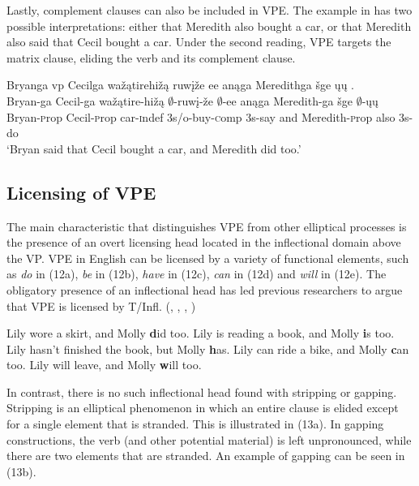 \documentclass[output=paper]{LSP/langsci}
\begin{document}
Lastly, complement clauses can also be included in VPE. The example in  has two possible interpretations: either that Meredith also bought a car, or that Meredith also said that Cecil bought a car. Under the second reading, VPE targets the matrix clause, eliding the verb and its complement clause.

\begin{exe}
\ex
\glll Bryanga {\ob}{vp} Cecilga wažątirehižą ruwįže ee{\cb} anąga Meredithga šge {\ob}ųų{\cb} .\\
Bryan-ga {} Cecil-ga wažątire-hižą $\emptyset$-ruwį-že $\emptyset$-ee anąga Meredith-ga šge $\emptyset$-ųų\\
Bryan-{\textsc prop} {} Cecil-{\textsc prop} car-{\textsc indef} {\textsc 3s/o}-buy-{\textsc comp} {\textsc 3s}-say and Meredith-{\textsc prop} also {\textsc 3s}-do\\
\trans `Bryan said that Cecil bought a car, and Meredith did too.'
\end{exe}


\subsection{Licensing of VPE}

The main characteristic that distinguishes VPE from other elliptical processes is the presence of an overt licensing head located in the inflectional domain above the VP. VPE in English can be licensed by a variety of functional elements, such as \emph{do} in (12a), \emph{be} in (12b), \emph{have} in (12c), \emph{can} in (12d) and \emph{will} in (12e). The obligatory presence of an inflectional head has led previous researchers to argue that VPE is licensed by T/Infl. (\citealt{Bresnan1976}, \citealt{Sag1976}, \citealt{Zagona1988}, \citealt{Lobeck1995})

\begin{exe}
\ex
\begin{xlist}
\ex
Lily wore a skirt, and Molly {\textbf did} too.
\ex
Lily is reading a book, and Molly {\textbf is} too.
\ex
Lily hasn't finished the book, but Molly {\textbf has}.
\ex
Lily can ride a bike, and Molly {\textbf can} too.
\ex
Lily will leave, and Molly {\textbf will} too.
\end{xlist}
\end{exe}


In contrast, there is no such inflectional head found with stripping or gapping. Stripping is an elliptical phenomenon in which an entire clause is elided except for a single element that is stranded. This is illustrated in (13a). In gapping constructions, the verb (and other potential material) is left unpronounced, while there are two elements that are stranded. An example of gapping can be seen in (13b).
\end{document}
